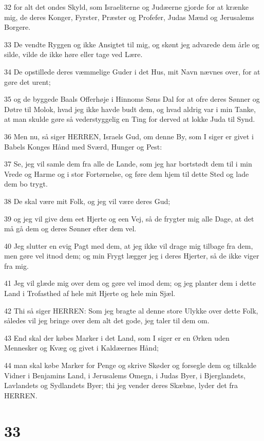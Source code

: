 \par 32 for alt det ondes Skyld, som Israeliterne og Judæerne gjorde for at krænke mig, de deres Konger, Fyrster, Præster og Profefer, Judas Mænd og Jerusalems Borgere.
\par 33 De vendte Ryggen og ikke Ansigtet til mig, og skønt jeg advarede dem årle og silde, vilde de ikke høre eller tage ved Lære.
\par 34 De opstillede deres væmmelige Guder i det Hus, mit Navn nævnes over, for at gøre det urent;
\par 35 og de byggede Baals Offerhøje i Hinnoms Søns Dal for at ofre deres Sønner og Døtre til Molok, hvad jeg ikke havde budt dem, og hvad aldrig var i min Tanke, at man skulde gøre så vederstyggelig en Ting for derved at lokke Juda til Synd.
\par 36 Men nu, så siger HERREN, Israels Gud, om denne By, som I siger er givet i Babels Konges Hånd med Sværd, Hunger og Pest:
\par 37 Se, jeg vil samle dem fra alle de Lande, som jeg har bortstødt dem til i min Vrede og Harme og i stor Fortørnelse, og føre dem hjem til dette Sted og lade dem bo trygt.
\par 38 De skal være mit Folk, og jeg vil være deres Gud;
\par 39 og jeg vil give dem eet Hjerte og een Vej, så de frygter mig alle Dage, at det må gå dem og deres Sønner efter dem vel.
\par 40 Jeg slutter en evig Pagt med dem, at jeg ikke vil drage mig tilbage fra dem, men gøre vel itnod dem; og min Frygt lægger jeg i deres Hjerter, så de ikke viger fra mig.
\par 41 Jeg vil glæde mig over dem og gøre vel imod dem; og jeg planter dem i dette Land i Trofasthed af hele mit Hjerte og hele min Sjæl.
\par 42 Thi så siger HERREN: Som jeg bragte al denne store Ulykke over dette Folk, således vil jeg bringe over dem alt det gode, jeg taler til dem om.
\par 43 End skal der købes Marker i det Land, som I siger er en Ørken uden Mennesker og Kvæg og givet i Kaldæernes Hånd;
\par 44 man skal købe Marker for Penge og skrive Skøder og forsegle dem og tilkalde Vidner i Benjamins Land, i Jerusalems Omegn, i Judas Byer, i Bjerglandets, Lavlandets og Sydlandets Byer; thi jeg vender deres Skæbne, lyder det fra HERREN.

\chapter{33}

